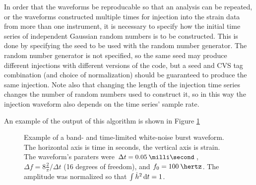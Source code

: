 \documentclass[10pt]{article}
\begin{document}
In order that the waveforms be reproducable so that an analysis can be
repeated, or the waveforms constructed multiple times for injection into
the strain data from more than one instrument, it is necessary to specify
how the initial time series of independent Gaussian random numbers is to be
constructed.  This is done by specifying the seed to be used with the
random number generator.  The random number generator is not specified, so
the same seed may produce different injections with different versions of
the code, but a seed and CVS tag combination (and choice of normalization)
should be guaranteed to produce the same injection.  Note also that
changing the length of the injection time series changes the number of
random numbers used to construct it, so in this way the injection waveform
also depends on the time series' sample rate.

An example of the output of this algorithm is shown in Figure \ref{fig5}
\begin{figure}
\begin{center}
\end{center}
\caption{Example of a band- and time-limited white-noise burst waveform.
The horizontal axis is time in seconds, the vertical axis is strain.  The
waveform's paraters were \(\Delta t = \unit{0.05}{\milli\second}\),
\(\Delta f = 8 \frac{2}{\pi} / \Delta t\) (16 degrees of freedom), and
\(f_{0} = \unit{100}{\hertz}\).  The amplitude was normalized so that
\(\int \dot{h}^{2} \,\mathrm{d} t = 1\).}
\label{fig5}
\end{figure}
\end{document}

